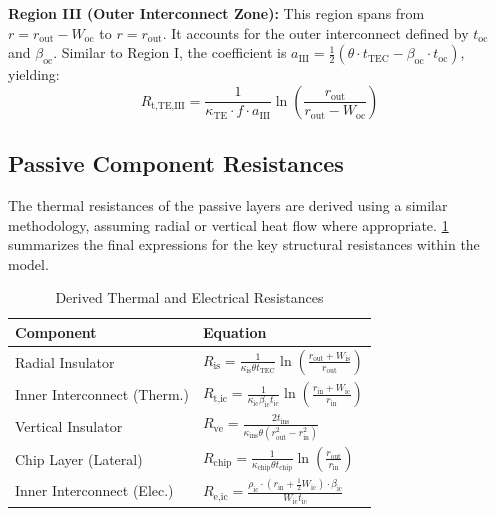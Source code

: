 \documentclass[conference,a4paper]{IEEEtran}
\begin{document}
\textbf{Region III (Outer Interconnect Zone):} This region spans from $r=r_{\text{out}}-W_{\text{oc}}$ to $r=r_{\text{out}}$. It accounts for the outer interconnect defined by $t_{\text{oc}}$ and $\beta_{\text{oc}}$. Similar to Region I, the coefficient is $a_{\text{III}} = \frac{1}{2}(\theta \cdot t_{\text{TEC}} - \beta_{\text{oc}} \cdot t_{\text{oc}})$, yielding:
\begin{equation}
	R_{\text{t,TE,III}} = \frac{1}{\kappa_{\text{TE}} \cdot f \cdot a_{\text{III}}} \ln \left( \frac{r_{\text{out}}}{r_{\text{out}} - W_{\text{oc}}} \right)
\end{equation}

\subsection{Passive Component Resistances}
The thermal resistances of the passive layers are derived using a similar methodology, assuming radial or vertical heat flow where appropriate. \cref{tab:resistances} summarizes the final expressions for the key structural resistances within the model.

\begin{table}[H]
	\centering
	\caption{Derived Thermal and Electrical Resistances}
	\label{tab:resistances}
	\begin{tabular}{@{}p{}p{}@{}}
		\toprule
		\textbf{Component}          & \textbf{Equation}                                                                                                                                       \\
		\midrule
		Radial Insulator            & $R_{\text{is}} = \frac{1}{\kappa_{\text{is}} \theta t_{\text{TEC}}} \ln \left( \frac{r_{\text{out}} + W_{\text{is}}}{r_{\text{out}}} \right)$           \\[6pt]
		Inner Interconnect (Therm.) & $R_{\text{t,ic}} = \frac{1}{\kappa_{\text{ic}} \beta_{\text{ic}} t_{\text{ic}}} \ln \left( \frac{r_{\text{in}} + W_{\text{ic}}}{r_{\text{in}}} \right)$ \\[6pt]
		Vertical Insulator          & $R_{\text{ve}} = \frac{2 t_{\text{ins}}}{\kappa_{\text{ins}} \theta (r_{\text{out}}^2 - r_{\text{in}}^2)}$                                              \\[6pt]
		Chip Layer (Lateral)        & $R_{\text{chip}} = \frac{1}{\kappa_{\text{chip}} \theta t_{\text{chip}}} \ln \left( \frac{r_{\text{out}}}{r_{\text{in}}} \right)$                       \\[6pt]
		Inner Interconnect (Elec.)  & $R_{\text{e,ic}} = \frac{\rho_{\text{ic}} \cdot (r_{\text{in}} + \frac{1}{2}W_{\text{ic}}) \cdot \beta_{\text{ic}}}{W_{\text{ic}} t_{\text{ic}}}$       \\
		\bottomrule
	\end{tabular}
\end{table}
\end{document}
